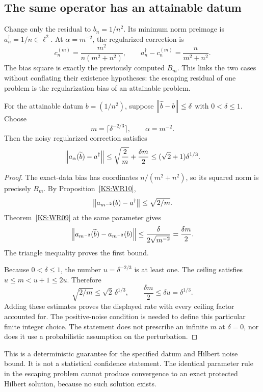 \subsection{The same operator has an attainable datum}
Change only the residual to $b_n=1/n^2$. Its minimum norm preimage is $a^\dagger_n=1/n\in\ell^2$. At $\alpha=m^{-2}$, the regularized correction is
\[
 c^{(m)}_n=\frac{m^2}{n(m^2+n^2)},\qquad
 a^\dagger_n-c^{(m)}_n=\frac{n}{m^2+n^2}.
\]
The bias square is exactly the previously computed $B_m$. This links the two cases without conflating their existence hypotheses: the escaping residual of one problem is the regularization bias of an attainable problem.

\begin{KScorollary}\label{KS:WR12}
For the attainable datum $b=(1/n^2)$, suppose $\left\lVert\widetilde b-b\right\rVert\le\delta$ with $0<\delta\le1$. Choose
\[
 m=\lceil\delta^{-2/3}\rceil,\qquad\alpha=m^{-2}.
\]
Then the noisy regularized correction satisfies
\[
 \left\lVert a_\alpha(\widetilde b)-a^\dagger\right\rVert
 \le\sqrt{\frac2m}+\frac{\delta m}{2}
 \le(\sqrt2+1)\delta^{1/3}.
\]
\end{KScorollary}
\begin{proof}
The exact-data bias has coordinates $n/(m^2+n^2)$, so its squared norm is precisely $B_m$. By Proposition~\ref{KS:WR10},
\[
 \left\lVert a_{m^{-2}}(b)-a^\dagger\right\rVert\le\sqrt{2/m}.
\]
Theorem~\ref{KS:WR09} at the same parameter gives
\[
 \left\lVert a_{m^{-2}}(\widetilde b)-a_{m^{-2}}(b)\right\rVert
 \le\frac{\delta}{2\sqrt{m^{-2}}}=\frac{\delta m}{2}.
\]
The triangle inequality proves the first bound.

Because $0<\delta\le1$, the number $u=\delta^{-2/3}$ is at least one. The ceiling satisfies $u\le m<u+1\le2u$. Therefore
\[
 \sqrt{2/m}\le\sqrt2\,\delta^{1/3},
 \qquad \frac{\delta m}{2}\le\delta u=\delta^{1/3}.
\]
Adding these estimates proves the displayed rate with every ceiling factor accounted for. The positive-noise condition is needed to define this particular finite integer choice. The statement does not prescribe an infinite $m$ at $\delta=0$, nor does it use a probabilistic assumption on the perturbation.
\end{proof}

This is a deterministic guarantee for the specified datum and Hilbert noise bound. It is not a statistical confidence statement. The identical parameter rule in the escaping problem cannot produce convergence to an exact protected Hilbert solution, because no such solution exists.

